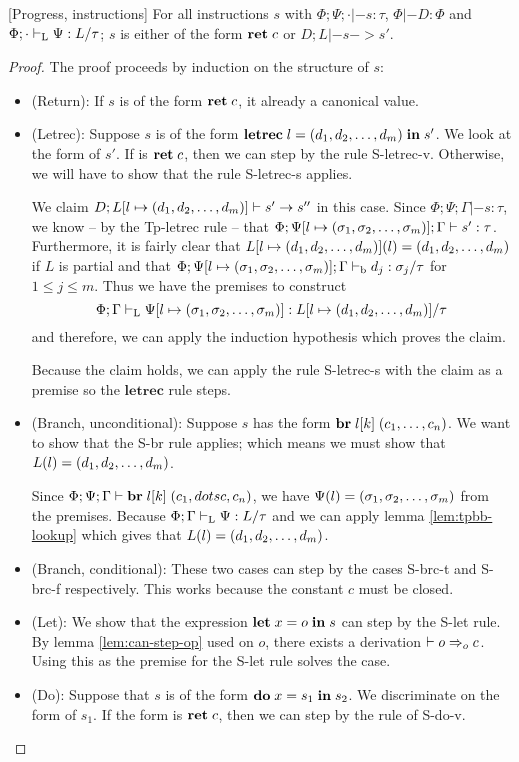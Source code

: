 \documentclass[a4paper, oneside, 10pt, draft]{memoir}
\begin{document}
\begin{lem}{[Progress, instructions]}
  \label{lem:progress-instructions}
  For all instructions $s$ with $\Phi;\Psi;\cdot |- s : \tau$, $\Phi
  |- D : \Phi$ and $\Phi;\cdot |-_{\mathrm{L}} \Psi : L / \tau$; $s$ is either
  of the form $\mathbf{ret} \; c$ or $D;L |- s -> s'$.
\end{lem}
\begin{proof}
  The proof proceeds by induction on the structure of $s$:
  \begin{itemize}
  \item (Return): If $s$ is of the form $\mathbf{ret} \; c$, it already a
    canonical value.
  \item (Letrec): Suppose $s$ is of the form
    $\mathbf{letrec} \; l = (d_1, d_2, \dotsc, d_m) \; \mathbf{in} \; s'$. We look at the form of $s'$. If is
    $\mathbf{ret} \; c$, then we can step by the rule S-letrec-v. Otherwise, we
    will have to show that the rule S-letrec-s applies.

    We claim $D;L[l \mapsto (d_1, d_2, \dotsc, d_m)] |- s' -> s''$ in this
    case. Since $\Phi;\Psi;\Gamma |- s : \tau$, we know -- by the
    Tp-letrec rule -- that $\Phi;\Psi[l \mapsto (\sigma_1, \sigma_2, \dotsc, \sigma_m)];\Gamma |- s'
    : \tau$. Furthermore, it is fairly clear that $L[l \mapsto
    (d_1, d_2, \dotsc, d_m)](l) = (d_1, d_2, \dotsc, d_m)$ if $L$ is partial and that $\Phi;\Psi[l
    \mapsto (\sigma_1, \sigma_2, \dotsc, \sigma_m)];\Gamma |-_{\mathrm{b}} d_j : \sigma_j / \tau$ for $1 \leq j
    \leq m$. Thus we have the premises to construct
    \begin{equation*}
      \Phi;\Gamma |-_{\mathrm{L}} \Psi[l \mapsto (\sigma_1, \sigma_2, \dotsc, \sigma_m)] : L[l \mapsto
      (d_1, d_2, \dotsc, d_m)] / \tau
    \end{equation*}
    and therefore, we can apply the induction hypothesis which proves the claim.

    Because the claim holds, we can apply the rule S-letrec-s with the
    claim as a premise so the $\mathbf{letrec}$ rule steps.
  \item (Branch, unconditional): Suppose $s$ has the form $\mathbf{br} \; l[k] \; (c_1, \dotsc,
      c_n)$. We want to show that the S-br rule applies; which means
    we must show that $L(l) = (d_1, d_2, \dotsc, d_m)$.

    Since $\Phi;\Psi;\Gamma |- \mathbf{br} \; l[k] \; (c_1, dotsc, c_n)$, we have
    $\Psi(l) = (\sigma_1, \sigma_2, \dotsc, \sigma_m)$ from the premises. Because $\Phi;\Gamma |-_{\mathrm{L}}
    \Psi : L / \tau$ and we can apply lemma
    \ref{lem:tpbb-lookup} which gives that $L(l) = (d_1, d_2, \dotsc, d_m)$.

  \item (Branch, conditional): These two cases can step by the cases
    S-brc-t and S-brc-f respectively. This works because the constant
    $c$ must be closed.
  \item (Let): We show that the expression $\mathbf{let} \; x = o \; \mathbf{in} \; s$ can step
    by the S-let rule. By lemma \ref{lem:can-step-op} used on $o$,
    there exists a derivation $|- o =>_{o} c$. Using this as the premise
    for the S-let rule solves the case.
  \item (Do): Suppose that $s$ is of the form $\mathbf{do} \; x = s_1 \; \mathbf{in} \; s_2$. We
    discriminate on the form of $s_1$. If the form is $\mathbf{ret} \; c$, then
    we can step by the rule of S-do-v.


\end{itemize}
\end{proof}
\end{document}
